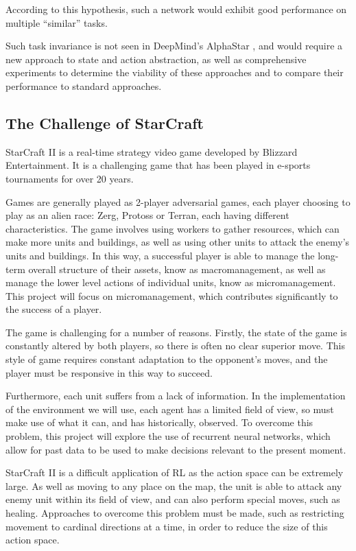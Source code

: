 According to this hypothesis, such a network would exhibit good performance on multiple ``similar'' tasks.

Such task invariance is not seen in DeepMind's AlphaStar \cite{alphastar}, and would require a new approach to state and action abstraction, as well as comprehensive experiments to determine the viability of these approaches and to compare their performance to standard approaches.


\subsection{The Challenge of StarCraft}

StarCraft II is a real-time strategy video game developed by Blizzard Entertainment. It is a challenging game that has been played in e-sports tournaments for over 20 years.

Games are generally played as 2-player adversarial games, each player choosing to play as an alien race: Zerg, Protoss or Terran, each having different characteristics. The game involves using workers to gather resources, which can make more units and buildings, as well as using other units to attack the enemy's units and buildings. In this way, a successful player is able to manage the long-term overall structure of their assets, know as macromanagement, as well as manage the lower level actions of individual units, know as micromanagement. This project will focus on micromanagement, which contributes significantly to the success of a player.

The game is challenging for a number of reasons. Firstly, the state of the game is constantly altered by both players, so there is often no clear superior move. This style of game requires constant adaptation to the opponent's moves, and the player must be responsive in this way to succeed. 

Furthermore, each unit suffers from a lack of information. In the implementation of the environment we will use, each agent has a limited field of view, so must make use of what it can, and has historically, observed. To overcome this problem, this project will explore the use of recurrent neural networks, which allow for past data to be used to make decisions relevant to the present moment.

StarCraft II is a difficult application of RL as the action space can be extremely large. As well as moving to any place on the map, the unit is able to attack any enemy unit within its field of view, and can also perform special moves, such as healing. Approaches to overcome this problem must be made, such as restricting movement to cardinal directions at a time, in order to reduce the size of this action space. 

